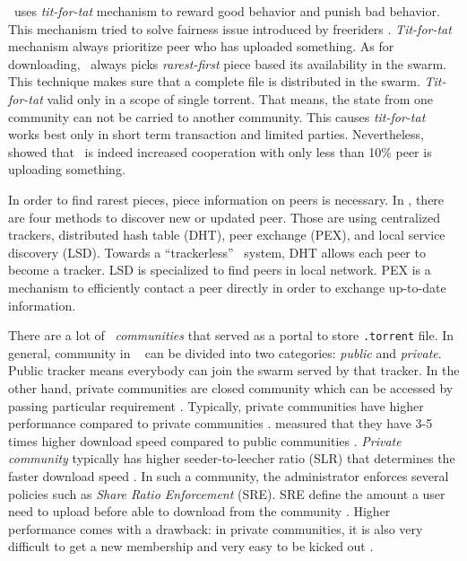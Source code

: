 
\bt~uses \textit{tit-for-tat} mechanism to reward good behavior and punish bad behavior. This mechanism tried to solve fairness issue introduced by freeriders \cite{2003:bittorrent:cohen}. \textit{Tit-for-tat} mechanism always prioritize peer who has uploaded something. As for downloading, \bt~always picks \textit{rarest-first} piece based its availability in the swarm. This technique makes sure that a complete file is distributed in the swarm. \textit{Tit-for-tat} valid only in a scope of single torrent. That means, the state from one community can not be carried to another community. This causes \textit{tit-for-tat} works best only in short term transaction and limited parties. Nevertheless, \citeauthor{2005:bittorrentcooperation:andrade} showed that \bt~is indeed increased cooperation with only less than 10\% peer is uploading something\cite{2005:bittorrentcooperation:andrade}.

In order to find rarest pieces, piece information on peers is necessary. In \bt, there are four methods to discover new or updated peer. Those are using centralized trackers, distributed hash table (DHT), peer exchange (PEX), and local service discovery (LSD). Towards a ``trackerless'' \bt~system, DHT allows each peer to become a tracker. LSD is specialized to find peers in local network. PEX is a mechanism to efficiently contact a peer directly in order to exchange up-to-date information.

There are a lot of \bt~\textit{communities} that served as a portal to store \texttt{.torrent} file. In general, community in \bt~ can be divided into two categories: \textit{public} and \textit{private}. Public tracker means everybody can join the swarm served by that tracker. In the other hand, private communities are closed community which can be accessed by passing particular requirement \cite{2010:pubpriv:meulpolder, 2014:sustainabilitytorrent:chen}. Typically, private communities have higher performance compared to private communities \cite{2010:pubpriv:meulpolder}. \citeauthor{2010:pubpriv:meulpolder} measured that they have 3-5 times higher download speed compared to public communities \cite{2010:pubpriv:meulpolder}. \textit{Private community} typically has higher seeder-to-leecher ratio (SLR) that determines the faster download speed \cite{2005:bittorrentcooperation:andrade}. In such a community, the administrator enforces several policies such as \textit{Share Ratio Enforcement} (SRE). SRE define the amount a user need to upload before able to download from the community \cite{2012:economicbt:kash}. 
Higher performance comes with a drawback: in private communities, it is also very difficult to get a new membership and very easy to be kicked out \cite{2013:survivepriv:jia}.

